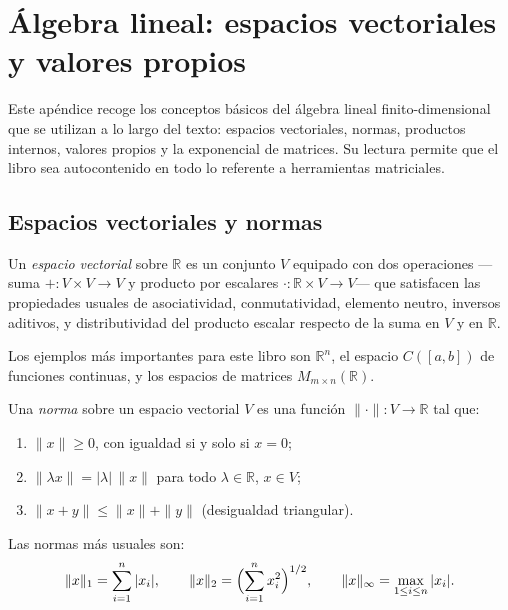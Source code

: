\chapter{Álgebra lineal: espacios vectoriales y valores propios}
\label{ap:algebra-lineal}

Este apéndice recoge los conceptos básicos del álgebra lineal finito-dimensional que se utilizan a lo largo del texto: espacios vectoriales, normas, productos internos, valores propios y la exponencial de matrices. Su lectura permite que el libro sea autocontenido en todo lo referente a herramientas matriciales.

\section{Espacios vectoriales y normas}

\begin{definition}
\label{def:espacio-vectorial-ap}
Un \emph{espacio vectorial} sobre $\mathbb{R}$ es un conjunto $V$ equipado con dos operaciones ---suma $+\colon V\times V\to V$ y producto por escalares $\cdot\colon\mathbb{R}\times V\to V$--- que satisfacen las propiedades usuales de asociatividad, conmutatividad, elemento neutro, inversos aditivos, y distributividad del producto escalar respecto de la suma en $V$ y en $\mathbb{R}$.
\end{definition}

Los ejemplos más importantes para este libro son $\mathbb{R}^n$, el espacio $C([a,b])$ de funciones continuas, y los espacios de matrices $M_{m\times n}(\mathbb{R})$.

\begin{definition}
\label{def:norma-ap}
Una \emph{norma} sobre un espacio vectorial $V$ es una función $\|\cdot\|\colon V\to\mathbb{R}$ tal que:
\begin{enumerate}
  \item[(i)] $\|x\|\geq 0$, con igualdad si y solo si $x=0$;
  \item[(ii)] $\|\lambda x\|=|\lambda|\,\|x\|$ para todo $\lambda\in\mathbb{R}$, $x\in V$;
  \item[(iii)] $\|x+y\|\leq\|x\|+\|y\|$ (desigualdad triangular).
\end{enumerate}
\end{definition}

\begin{example}
Las normas más usuales son:
\[
  \|x\|_1=\sum_{i=1}^{n}|x_i|,\qquad
  \|x\|_2=\Bigl(\sum_{i=1}^{n}x_i^2\Bigr)^{1/2},\qquad
  \|x\|_\infty=\max_{1\leq i\leq n}|x_i|.
\]
\end{example}

